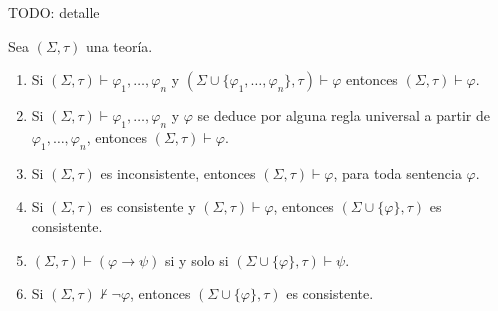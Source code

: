   TODO: detalle
  \begin{lemma} \label{lemma_71}
    \PN Sea $(\Sigma, \tau)$ una teoría.
    \begin{enumerate}[(1)]
      \item Si $(\Sigma, \tau) \vdash \varphi_{1}, \dotsc, \varphi_{n}$ y $(\Sigma \cup \{\varphi_{1}, \dotsc,
      \varphi_{n}\},\tau) \vdash \varphi$ entonces $(\Sigma, \tau) \vdash \varphi$.
      \item Si $(\Sigma, \tau) \vdash \varphi_{1}, \dotsc, \varphi_{n}$ y $\varphi$ se deduce por alguna regla universal
      a partir de $\varphi_{1}, \dotsc, \varphi_{n}$, entonces $(\Sigma, \tau) \vdash \varphi$.
      \item Si $(\Sigma, \tau)$ es inconsistente, entonces $(\Sigma, \tau) \vdash \varphi$, para toda sentencia
      $\varphi$.
      \item Si $(\Sigma, \tau)$ es consistente y $(\Sigma, \tau) \vdash \varphi$, entonces $(\Sigma \cup \{\varphi\},
      \tau)$ es consistente.
      \item $(\Sigma, \tau) \vdash (\varphi \rightarrow \psi)$ si y solo si $ (\Sigma \cup \{\varphi\}, \tau) \vdash
      \psi$.
      \item Si $(\Sigma, \tau) \not \vdash \lnot \varphi$, entonces $(\Sigma \cup \{\varphi\}, \tau)$ es consistente.
    \end{enumerate}
  \end{lemma}
